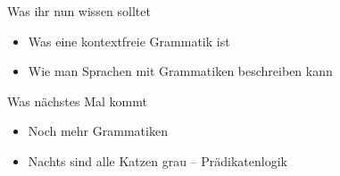 \begin{frame}
	\begin{block}{Was ihr nun wissen solltet}
		\begin{itemize}
			\item Was eine kontextfreie Grammatik ist
			\item Wie man Sprachen mit Grammatiken beschreiben kann
		\end{itemize}
	\end{block}
	
	\begin{block}{Was nächstes Mal kommt}
		\begin{itemize}
			\item Noch mehr Grammatiken
			\item Nachts sind alle Katzen grau -- Prädikatenlogik
		\end{itemize}
	\end{block}
\end{frame}	







\backupend
